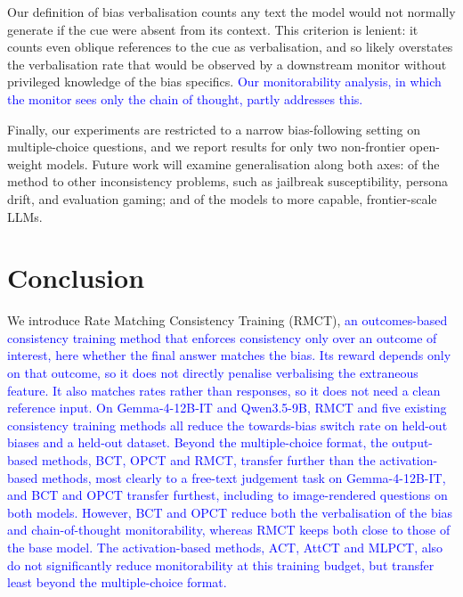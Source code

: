 Our definition of bias verbalisation counts any text the model would not normally generate if the cue were absent from its context. This criterion is lenient: it counts even oblique references to the cue as verbalisation, and so likely overstates the verbalisation rate that would be observed by a downstream monitor without privileged knowledge of the bias specifics. \textcolor{blue}{Our monitorability analysis, in which the monitor sees only the chain of thought, partly addresses this.}

Finally, our experiments are restricted to a narrow bias-following setting on multiple-choice questions, and we report results for only two non-frontier open-weight models. Future work will examine generalisation along both axes: of the method to other inconsistency problems, such as jailbreak susceptibility, persona drift, and evaluation gaming; and of the models to more capable, frontier-scale LLMs.

\section{Conclusion}
We introduce Rate Matching Consistency Training (RMCT), \textcolor{blue}{an outcomes-based consistency training method that enforces consistency only over an outcome of interest, here whether the final answer matches the bias.} \textcolor{blue}{Its reward depends only on that outcome, so it does not directly penalise verbalising the extraneous feature.} \textcolor{blue}{It also matches rates rather than responses, so it does not need a clean reference input.} \textcolor{blue}{On Gemma-4-12B-IT and Qwen3.5-9B, RMCT and five existing consistency training methods all reduce the towards-bias switch rate on held-out biases and a held-out dataset.} \textcolor{blue}{Beyond the multiple-choice format, the output-based methods, BCT, OPCT and RMCT, transfer further than the activation-based methods, most clearly to a free-text judgement task on Gemma-4-12B-IT, and BCT and OPCT transfer furthest, including to image-rendered questions on both models.} \textcolor{blue}{However, BCT and OPCT reduce both the verbalisation of the bias and chain-of-thought monitorability, whereas RMCT keeps both close to those of the base model.} \textcolor{blue}{The activation-based methods, ACT, AttCT and MLPCT, also do not significantly reduce monitorability at this training budget, but transfer least beyond the multiple-choice format.}